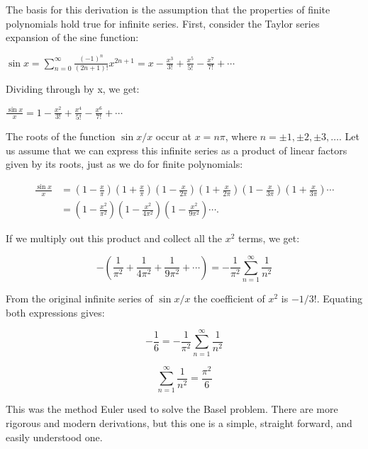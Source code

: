 \documentclass[12pt]{article}
\begin{document}
The basis for this derivation is the assumption that the properties of finite polynomials hold true for infinite series. First, consider the Taylor series expansion of the sine function:

$\displaystyle \sin x = \sum_{n = 0}^{\infty} \frac{(-1)^n}{(2n + 1)!} x^{2n + 1} = x - \frac{x^3}{3!} + \frac{x^5}{5!} - \frac{x^7}{7!} + \cdots$

Dividing through by x, we get:

$\displaystyle \frac{\sin x}{x} = 1 - \frac{x^2}{3!} + \frac{x^4}{5!} - \frac{x^6}{7!} + \cdots$

The roots of the function $\sin x/x$ occur at $x = n\pi$, where $n = \pm 1, \pm 2, \pm 3, \ldots$.
Let us assume that we can express this infinite series as a product of linear factors given by its roots, just as we do for finite polynomials:

\begin{eqnarray*}
\frac{\sin x}{x} &= \left( 1 - \frac{x}{\pi} \right)\left( 1 + \frac{x}{\pi} \right)\left( 1 - \frac{x}{2\pi} \right)\left( 1 + \frac{x}{2\pi} \right)\left( 1 - \frac{x}{3\pi} \right)\left( 1 + \frac{x}{3\pi} \right)\cdots\\
&= \left( 1 - \frac{x^2}{\pi^2} \right)\left( 1 - \frac{x^2}{4\pi^2} \right)\left( 1 - \frac{x^2}{9\pi^2} \right)\cdots.
\end{eqnarray*}

If we multiply out this product and collect all the $x^2$ terms, we get:

$$\displaystyle -\left(\frac{1}{\pi^2} + \frac{1}{4\pi^2} + \frac{1}{9\pi^2} + \cdots \right) = -\frac{1}{\pi^2} \sum_{n=1}^{\infty}\frac{1}{n^2}$$

From the original infinite series of $\sin x/x$ the coefficient of $x^2$ is $-1/3!$. Equating both expressions gives:

$$\displaystyle -\frac{1}{6} = -\frac{1}{\pi^2}\sum_{n=1}^{\infty}\frac{1}{n^2}$$

$$\displaystyle \sum_{n=1}^{\infty}\frac{1}{n^2} = \frac{\pi^2}{6}$$

This was the method Euler used to solve the Basel problem. There are more rigorous and modern derivations, but this one is a simple, straight forward, and easily understood one.

\end{document}
